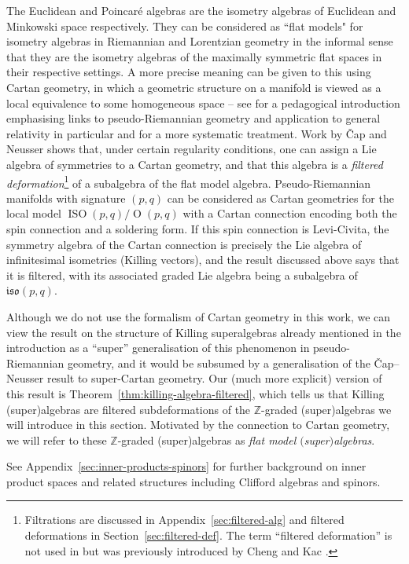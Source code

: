 \documentclass[pdftex]{sigma}
\numberwithin{equation}{section}
\newcommand{\fiso}{\mathfrak{iso}}
\newcommand{\ZZ}{\mathbb{Z}}
\newcommand{\1}{\mathbbm{1}}
\DeclareMathOperator{\Orth}{O}
\DeclareMathOperator{\ISO}{ISO}
\begin{document}
The Euclidean and Poincar\'e algebras are the isometry algebras of Euclidean and Minkowski space respectively. They can be considered as ``flat models" for isometry algebras in Riemannian and Lorentzian geometry in the informal sense that they are the isometry algebras of the maximally symmetric flat spaces in their respective settings. A more precise meaning can be given to this using Cartan geometry, in which a geometric structure on a manifold is viewed as a local equivalence to some homogeneous space -- see \cite{Wise2010} for a pedagogical introduction emphasising links to pseudo-Riemannian geometry and application to general relativity in particular and \cite{Cap2009_1} for a more systematic treatment. Work by \v{C}ap and Neusser \cite{Cap2009} shows that, under certain regularity conditions, one can assign a Lie algebra of symmetries to a Cartan geometry, and that this algebra is a \emph{filtered deformation}\footnote{Filtrations are discussed in Appendix~\ref{sec:filtered-alg} and filtered deformations in Section~\ref{sec:filtered-def}. The term ``filtered deformation'' is not used in \cite{Cap2009} but was previously introduced by Cheng and Kac \cite{Cheng1998}.}
of a subalgebra of the flat model algebra. Pseudo-Riemannian manifolds with signature $(p,q)$ can be considered as Cartan geometries for the local model $\ISO(p,q)/\Orth(p,q)$ with a Cartan connection encoding both the spin connection and a soldering form. If this spin connection is Levi-Civita, the symmetry algebra of the Cartan connection is precisely the Lie algebra of infinitesimal isometries (Killing vectors), and the result discussed above says that it is filtered, with its associated graded Lie algebra being a subalgebra of $\fiso(p,q)$.

Although we do not use the formalism of Cartan geometry in this work, we can view the result on the structure of Killing superalgebras already mentioned in the introduction as a ``super'' generalisation of this phenomenon in pseudo-Riemannian geometry, and it would be subsumed by a generalisation of the \v{C}ap--Neusser result \cite{Cap2009} to super-Cartan geometry. Our (much more explicit) version of this result is Theorem~\ref{thm:killing-algebra-filtered}, which tells us that Killing (super)algebras are filtered subdeformations of the $\ZZ$-graded (super)algebras we will introduce in this section. Motivated by the connection to Cartan geometry, we will refer to these $\ZZ$-graded (super)algebras as \emph{flat model $($super$)$algebras}.

See Appendix~\ref{sec:inner-products-spinors} for further background on inner product spaces and related structures including Clifford algebras and spinors.
\end{document}
